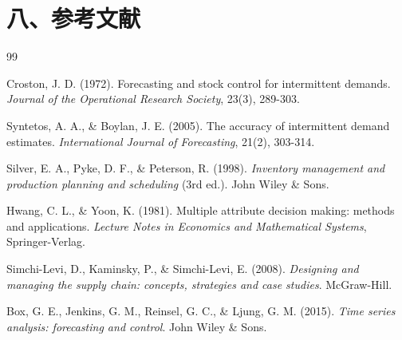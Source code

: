 \section{八、参考文献}\label{ux516bux53c2ux8003ux6587ux732e}

\begin{thebibliography}{99}

Croston, J. D. (1972). Forecasting and stock control for intermittent demands. \emph{Journal of the Operational Research Society}, 23(3), 289-303.

Syntetos, A. A., \& Boylan, J. E. (2005). The accuracy of intermittent demand estimates. \emph{International Journal of Forecasting}, 21(2), 303-314.

Silver, E. A., Pyke, D. F., \& Peterson, R. (1998). \emph{Inventory management and production planning and scheduling} (3rd ed.). John Wiley \& Sons.

Hwang, C. L., \& Yoon, K. (1981). Multiple attribute decision making: methods and applications. \emph{Lecture Notes in Economics and Mathematical Systems}, Springer-Verlag.

Simchi-Levi, D., Kaminsky, P., \& Simchi-Levi, E. (2008). \emph{Designing and managing the supply chain: concepts, strategies and case studies}. McGraw-Hill.

Box, G. E., Jenkins, G. M., Reinsel, G. C., \& Ljung, G. M. (2015). \emph{Time series analysis: forecasting and control}. John Wiley \& Sons.

\end{thebibliography}
